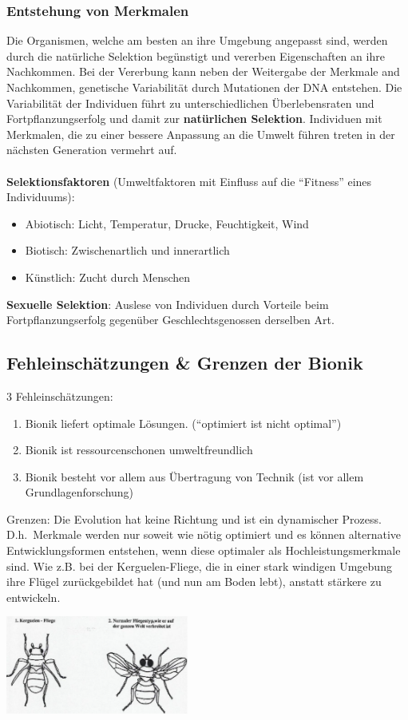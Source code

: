 \subsubsection{Entstehung von Merkmalen}

Die Organismen, welche am besten an ihre Umgebung angepasst sind, werden durch die natürliche Selektion begünstigt und vererben Eigenschaften an ihre Nachkommen. Bei der Vererbung kann neben der Weitergabe der Merkmale and Nachkommen, genetische Variabilität durch Mutationen der DNA entstehen.
Die Variabilität der Individuen führt zu unterschiedlichen
Überlebensraten und Fortpflanzungserfolg und damit zur \textbf{natürlichen Selektion}. Individuen mit Merkmalen, die zu einer bessere Anpassung an die Umwelt führen treten in der nächsten Generation vermehrt auf.
\\
\\
\textbf{Selektionsfaktoren} (Umweltfaktoren mit Einfluss auf die ``Fitness'' eines Individuums):
\begin{itemize}
	\item Abiotisch: Licht, Temperatur, Drucke, Feuchtigkeit, Wind
	\item Biotisch: Zwischenartlich und innerartlich
	\item Künstlich: Zucht durch Menschen
\end{itemize}
\textbf{Sexuelle Selektion}: Auslese von Individuen durch Vorteile beim Fortpflanzungserfolg gegenüber Geschlechtsgenossen derselben Art.

\subsection{Fehleinschätzungen \& Grenzen der Bionik}

3 Fehleinschätzungen:
\begin{enumerate}
	\item Bionik liefert optimale Lösungen. (``optimiert ist nicht optimal'')
	\item Bionik ist ressourcenschonen umweltfreundlich
	\item Bionik besteht vor allem aus Übertragung von Technik (ist vor allem Grundlagenforschung)
\end{enumerate}
Grenzen: Die Evolution hat keine Richtung und ist ein dynamischer Prozess. D.h.\ Merkmale werden nur soweit wie nötig optimiert und es können alternative Entwicklungsformen entstehen, wenn diese optimaler als Hochleistungsmerkmale sind. Wie z.B. bei der Kerguelen-Fliege, die in einer stark windigen Umgebung ihre Flügel zurückgebildet hat (und nun am Boden lebt), anstatt stärkere zu entwickeln. 
\begin{center}
	\includegraphics[width=6cm]{lec1/figures/fliege.png}
\end{center}
